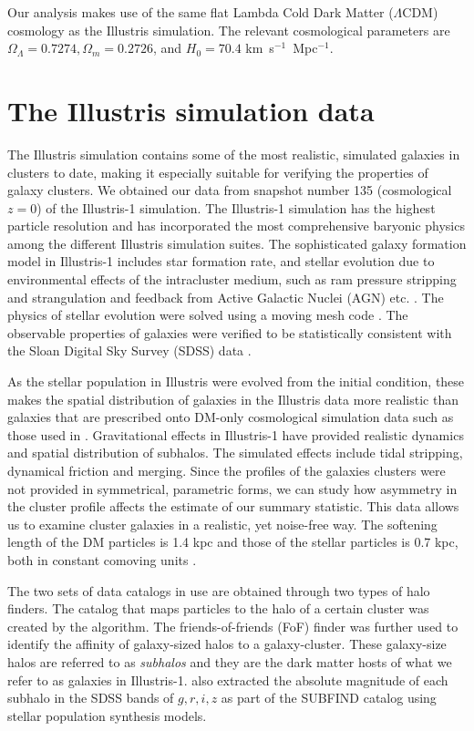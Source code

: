 	Our analysis makes use of the same flat Lambda Cold Dark Matter ($\Lambda$CDM) cosmology
as the Illustris simulation. The relevant cosmological parameters are
$\Omega_\Lambda = 0.7274, \Omega_m = 0.2726$, and $H_0 = 70.4$
km~s$^{-1}$~Mpc$^{-1}$.

\section{The Illustris simulation data} 
\label{sec:illustris_sim}
The Illustris simulation contains some of the most
realistic, simulated galaxies in clusters to date, making it especially suitable for 
verifying the properties of galaxy clusters. We obtained our data from 
snapshot number 135 (cosmological $z=0$) of the Illustris-1 simulation. The Illustris-1
simulation has the highest particle resolution and has incorporated the most 
comprehensive baryonic physics among the different Illustris simulation suites. 
The sophisticated galaxy formation model in Illustris-1 
includes star formation rate, and stellar evolution due to
environmental effects of the intracluster medium, such as ram pressure stripping and
strangulation and feedback from Active Galactic Nuclei (AGN) etc. \citep{Genel2014a}.
The physics of stellar
evolution were solved using a moving mesh code {} \citep{Springel2010}.
The observable properties of galaxies were verified to be statistically consistent
with the Sloan Digital Sky Survey (SDSS) data
\citep{Vogelsberger2014}. 

As the stellar population in Illustris were evolved from the initial condition,
these makes the spatial distribution of galaxies in the Illustris data more 
realistic than galaxies that are prescribed onto DM-only cosmological
simulation data such as those used in \cite{Harvey2013d}.  
Gravitational effects in Illustris-1 have provided realistic dynamics and
spatial distribution of subhalos. The simulated effects include
tidal stripping, dynamical friction and merging. 
Since the profiles of the galaxies clusters were not
provided in symmetrical, parametric forms, we can study 
how asymmetry in the cluster profile affects the estimate of our summary 
statistic. This data allows us to examine cluster galaxies
in a realistic, yet noise-free way. The softening length of the DM particles is
1.4 kpc and those of the stellar particles is 
0.7 kpc, both in constant comoving units \citep{Genel2014a}.

The two sets of data catalogs in use are obtained through two types of halo
finders. The catalog that maps particles to the halo of a certain cluster was 
created by the {} algorithm. The friends-of-friends (FoF) 
finder \citep{Davis1985} was further used to identify the affinity
of galaxy-sized halos to a galaxy-cluster. 
These galaxy-size halos are referred to as {\it subhalos} and 
they are the dark matter hosts of what we refer to as galaxies in Illustris-1. 
\cite{Vogelsberger2014a} also extracted the 
absolute magnitude of each subhalo in
the SDSS bands of $g, r, i, z$ as part of the {\sc
SUBFIND} catalog using stellar population synthesis models.

